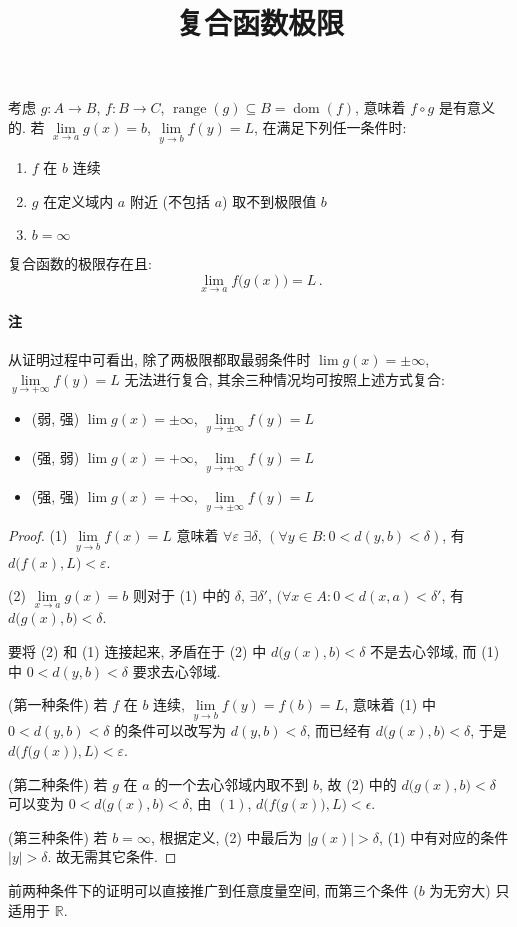 \documentclass[UTF8]{ctexart}
\title{复合函数极限}
\date{}
\newcommand{\R}{\mathbb R}
\begin{document}
\maketitle
\vspace{-4em}

考虑 $ g \colon A \to B $, $ f \colon B \to C $, $ \operatorname{range}(g) \subseteq B = \operatorname{dom}(f) $, 意味着 $ f \circ g $ 是有意义的. 若 $ \lim\limits_{x \to a} g(x) = b $, $ \lim\limits_{y \to b} f(y) = L $, 在满足下列任一条件时:
\begin{enumerate}
	\item $ f $ 在 $ b $ 连续
	\item $ g $ 在定义域内 $ a $ 附近 (不包括 $ a $) 取不到极限值 $ b $
	\item $ b = \infty $
\end{enumerate}

复合函数的极限存在且:
\[
	\lim_{x \to a} f \big( g(x) \big) = L \,.
\]

\paragraph{注}
从证明过程中可看出, 除了两极限都取最弱条件时 $ \lim g(x) = \pm\infty $, $ \lim\limits_{y \to + \infty} f(y) = L $ 无法进行复合, 其余三种情况均可按照上述方式复合: 
\begin{itemize}
	\item (弱, 强) $ \lim g(x) = \pm \infty $, $ \lim\limits_{y \to \pm \infty} f(y) = L $
	\item (强, 弱) $ \lim g(x) = + \infty $, $ \lim\limits_{y \to + \infty} f(y) = L $
	\item (强, 强) $ \lim g(x) = + \infty $, $ \lim\limits_{y \to \pm \infty} f(y) = L $
\end{itemize}

\begin{proof}
	(1) $ \lim\limits_{y \to b} f(x) = L $ 意味着 $ \forall \varepsilon $ $ \exists \delta $, $ (\forall y \in B \colon 0 < d(y, b) < \delta) $, 有 $ d \big( f(x), L \big) < \varepsilon $.

	(2) $ \lim\limits_{x \to a} g(x) = b $ 则对于 (1) 中的 $ \delta $, $ \exists \delta' $, $ ( \forall x \in A \colon 0 < d(x, a) < \delta' $, 有 $ d \big( g(x), b \big) < \delta $.

	要将 (2) 和 (1) 连接起来, 矛盾在于 (2) 中 $ d \big( g(x), b \big) < \delta $ 不是去心邻域, 而 (1) 中 $ 0 < d(y, b) < \delta $ 要求去心邻域.

	(第一种条件) 若 $ f $ 在 $ b $ 连续, $ \lim\limits_{y \to b} f(y) = f(b) = L $, 意味着 (1) 中 $ 0 < d(y, b) < \delta $ 的条件可以改写为 $ d(y, b) < \delta $, 而已经有 $ d \big( g(x), b \big) < \delta $, 于是 $ d \Big( f \big( g(x) \big), L \Big) < \varepsilon $.

	(第二种条件) 若 $ g $ 在 $ a $ 的一个去心邻域内取不到 $ b $, 故 (2) 中的 $ d \big( g(x), b \big) < \delta $ 可以变为 $ 0 < d \big( g(x), b \big) < \delta $, 由 $ (1) $, $ d \Big( f \big( g(x) \big), L \Big) < \epsilon $.

	(第三种条件) 若 $ b = \infty $, 根据定义, (2) 中最后为 $ |g(x)| > \delta $, (1) 中有对应的条件 $ |y| > \delta $. 故无需其它条件.
\end{proof}

前两种条件下的证明可以直接推广到任意度量空间, 而第三个条件 ($ b $ 为无穷大) 只适用于 $ \R $.
\end{document}
